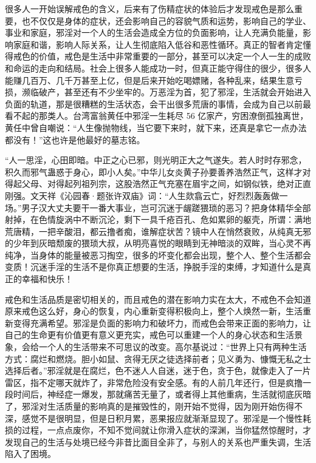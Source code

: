 很多人一开始误解戒色的含义，后来有了伤精症状的体验后才发现戒色是那么重要，也不仅仅是身体的症状，还会影响自己的容貌气质和运势，影响自己的学业、事业和家庭，邪淫对一个人的生活会造成全方位的负面影响，让人充满负能量，影响家庭和谐，影响人际关系，让人生彻底陷入低谷和恶性循环。真正的智者肯定懂得戒色的价值，戒色是生活中非常重要的一部分，甚至可以决定一个人一生的成败和命运的走向和结局。社会上很多人能成功一时，但真正能守得住的很少，很多人能赚几百万、几千万甚至上亿，但是后来开始吃喝嫖赌，各种乱来，结果生意亏损，濒临破产，甚至还有不少坐牢的。万恶淫为首，犯了邪淫，生活就会开始进入负面的轨道，那是很糟糕的生活状态，会干出很多荒唐的事情，会成为自己以前最看不起的那类人。台湾富翁黄任中邪淫一生耗尽 56 亿家产，穷困潦倒孤独离世，黄任中曾自嘲说：“人生像抛物线，当它要下来时，就下来，还真是拿它一点办法都没有！”这也许是他最好的墓志铭。

“人一思淫，心田即暗。中正之心已邪，则光明正大之气遂失。若人时时存邪念，积久而邪气蛊惑于身心，即小人矣。”中华儿女炎黄子孙要善养浩然正气，这样才对得起父母、对得起列祖列宗，这股浩然正气充塞在眉宇之间，如钢似铁，绝对正直刚强。文天祥《沁园春·题张许双庙》词：“人生欻翕云亡，好烈烈轰轰做一场。”男子汉大丈夫要干一番大事业，岂可沉迷于龌蹉猥琐的恶习？把身体精华全部射掉，在色情旋涡中不断沉沦，剩下一具千疮百孔、危如累卵的躯壳，所谓：满地荒唐精，一把辛酸泪，都云撸者痴，谁解症状苦？镜中人在悄然衰败，从纯真无邪的少年到灰暗颓废的猥琐大叔，从明亮喜悦的眼睛到无神暗淡的双眸，当心灵不再纯净，当身体的能量被恶习掏空，很多的坏变化都会出现，整个人、整个生活都会变质！沉迷手淫的生活不是你真正想要的生活，挣脱手淫的束缚，才知道什么是真正的幸福和快乐！

戒色和生活品质是密切相关的，而且戒色的潜在影响力实在太大，不戒色不会知道原来戒色这么好，身心的恢复，内心重新变得积极向上，整个人焕然一新，生活重新变得充满希望。邪淫是负面的影响力和破坏力，而戒色会带来正面的影响力，让自己的生命更有价值更有意义更充实，戒色可以重建一个人的身心状态和生活景象，会给一个人的生活带来不可思议的改变。高尔基说过：“世界上只有两种生活方式：腐烂和燃烧。胆小如鼠、贪得无厌之徒选择前者；见义勇为、慷慨无私之士选择后者。”邪淫就是在腐烂，色不迷人人自迷，迷于色，贪于色，就像走入了一片雷区，指不定哪天就炸了，非常危险没有安全感。有的人前几年还行，但是疯撸一段时间后，神经症一爆发，那就痛苦无量了，或者得上其他重病，生活就彻底灰暗了，邪淫对生活质量的影响真的是摧毁性的，刚开始不觉得，因为刚开始伤得不深，感觉不是很明显，但是日积月累，恶果报应就渐渐显现了。邪淫是一个慢性耗损的过程，一点点废你，不知不觉间就让你滑入症状的深渊，当你猛然惊醒时，才发现自己的生活与处境已经今非昔比面目全非了，与别人的关系也严重失调，生活陷入了困境。

